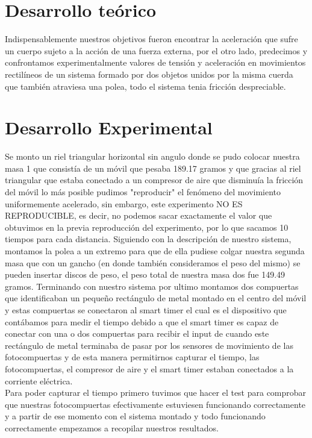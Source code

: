 \documentclass{article}
\begin{document}
\begin{multicols}{2}



\section*{Desarrollo teórico}\label{Desarrollo Teorico}                              	%
Indispensablemente nuestros objetivos fueron encontrar la aceleración que sufre un cuerpo sujeto a la acción de una fuerza
externa, por el otro lado, predecimos y confrontamos experimentalmente valores de tensión y aceleración en movimientos rectilíneos
de un sistema formado por dos objetos unidos por la misma cuerda que también atraviesa una polea, todo el sistema tenia fricción despreciable.

\section*{Desarrollo Experimental}\label{Desarrollo experimental}				%

Se monto un riel triangular horizontal sin angulo donde se pudo colocar nuestra masa 1 que consistía de un móvil que pesaba 189.17 gramos y que gracias 
al riel triangular que estaba conectado a un compresor de aire que disminuía la fricción del móvil lo más posible pudimos "reproducir" el fenómeno 
del movimiento uniformemente acelerado, sin embargo, este experimento NO ES REPRODUCIBLE, es decir, no podemos sacar exactamente el valor que obtuvimos en la previa reproducción del experimento,
por lo que sacamos 10 tiempos para cada distancia. Siguiendo con la descripción de nuestro sistema, montamos la polea a un extremo para que de ella pudiese colgar nuestra segunda masa que con un gancho (en donde también consideramos el peso del mismo) se pueden insertar discos de peso,
el peso total de nuestra masa dos fue 149.49 gramos. Terminando con nuestro sistema por ultimo montamos dos compuertas que identificaban un pequeño rectángulo de metal montado en el centro del móvil y estas compuertas se conectaron al smart timer
el cual es el dispositivo que contábamos para medir el tiempo debido a que el smart timer es capaz de conectar con una o dos compuertas para recibir el input de cuando este rectángulo de metal terminaba de pasar por los sensores de movimiento de las fotocompuertas y de esta manera permitirnos 
capturar el tiempo, las fotocompuertas, el compresor de aire y el smart timer estaban conectados a la corriente eléctrica.
\\
Para poder capturar el tiempo primero tuvimos que hacer el test para comprobar que nuestras fotocompuertas efectivamente estuviesen funcionando correctamente y a partir de ese momento con el sistema montado y todo funcionando correctamente empezamos a recopilar nuestros resultados.     

\end{multicols}
\end{document}
